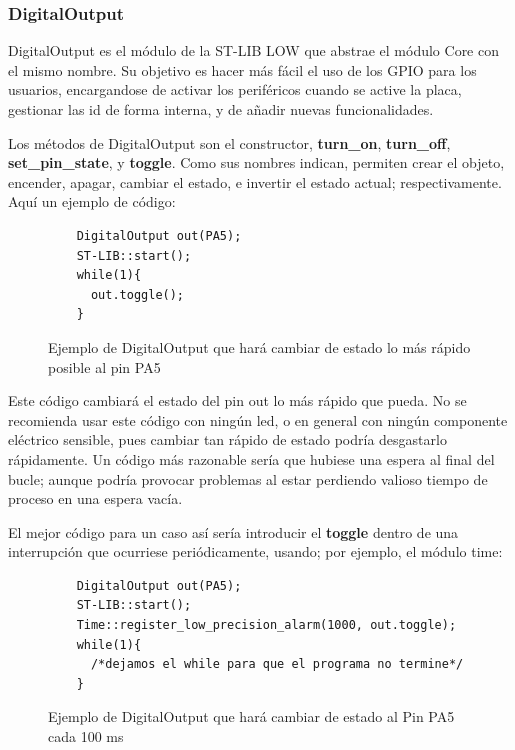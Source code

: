 \documentclass{report}
\begin{document}
\subsubsection{DigitalOutput}
DigitalOutput es el módulo de la ST-LIB LOW que abstrae el módulo Core con el mismo nombre. Su objetivo es hacer más fácil el uso de los GPIO para los usuarios, encargandose de activar los periféricos cuando se active la placa, gestionar las id de forma interna, y de añadir nuevas funcionalidades. 
\par \vspace{0.3cm}
Los métodos de DigitalOutput son el constructor, \textbf{turn\_on}, \textbf{turn\_off}, \textbf{set\_pin\_state}, y \textbf{toggle}. Como sus nombres indican, permiten crear el objeto, encender, apagar, cambiar el estado, e invertir el estado actual; respectivamente. Aquí un ejemplo de código: 
\begin{figure}[H]
  \begin{lstlisting}
    DigitalOutput out(PA5);
    ST-LIB::start();
    while(1){
      out.toggle();
    }
  \end{lstlisting}
  \caption{Ejemplo de DigitalOutput que hará cambiar de estado lo más rápido posible al pin PA5}
  \label{DigitalOutputCode}
\end{figure}
\par \vspace{0.3cm}
Este código cambiará el estado del pin out lo más rápido que pueda. No se recomienda usar este código con ningún led, o en general con ningún componente eléctrico sensible, pues cambiar tan rápido de estado podría desgastarlo rápidamente. Un código más razonable sería que hubiese una espera al final del bucle; aunque podría provocar problemas al estar perdiendo valioso tiempo de proceso en una espera vacía. \par
El mejor código para un caso así sería introducir el \textbf{toggle} dentro de una interrupción que ocurriese periódicamente, usando; por ejemplo, el módulo time: 
\begin{figure}[H]
  \begin{lstlisting}
    DigitalOutput out(PA5);
    ST-LIB::start();
    Time::register_low_precision_alarm(1000, out.toggle);
    while(1){
      /*dejamos el while para que el programa no termine*/
    }
  \end{lstlisting}
  \caption{Ejemplo de DigitalOutput que hará cambiar de estado al Pin PA5 cada 100 ms}
  \label{DigitalOutputBetterCode}
\end{figure}
\end{document}
